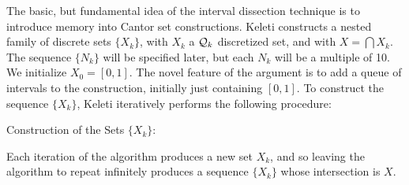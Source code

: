 
The basic, but fundamental idea of the interval dissection technique is to introduce memory into Cantor set constructions. Keleti constructs a nested family of discrete sets $\{ X_k \}$, with $X_k$ a $\operatorname{\mathcal{Q}}_k$ discretized set, and with $X = \bigcap X_k$. The sequence $\{ N_k \}$ will be specified later, but each $N_k$ will be a multiple of 10. We initialize $X_0 = [0,1]$. The novel feature of the argument is to add a queue of intervals to the construction, initially just containing $[0,1]$. To construct the sequence $\{ X_k \}$, Keleti iteratively performs the following procedure:
%
\begin{algorithm}[H]
    \begin{algorithmic}%
        \caption{Construction of the Sets $\{ X_k \}$:}
        \MRepeat


            \EndForAll
        \EndRepeat   
    \end{algorithmic}
\end{algorithm}

Each iteration of the algorithm produces a new set $X_k$, and so leaving the algorithm to repeat infinitely produces a sequence $\{ X_k \}$ whose intersection is $X$.

